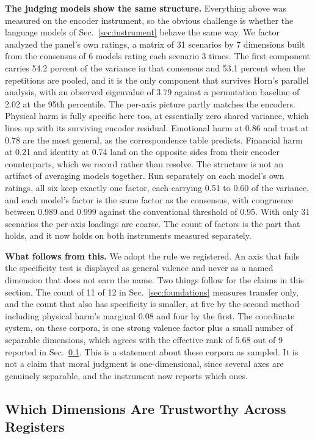 \documentclass[journal]{IEEEtran}
\begin{document}
\textbf{The judging models show the same structure.} Everything above was
measured on the encoder instrument, so the obvious challenge is whether the
language models of Sec.~\ref{sec:instrument} behave the same way. We factor
analyzed the panel's own ratings, a matrix of 31 scenarios by 7 dimensions
built from the consensus of 6 models rating each scenario 3 times. The first
component carries 54.2 percent of the variance in that consensus and 53.1
percent when the repetitions are pooled, and it is the only component that
survives Horn's parallel analysis, with an observed eigenvalue of 3.79
against a permutation baseline of 2.02 at the 95th percentile. The per-axis
picture partly matches the encoders. Physical harm is fully specific here
too, at essentially zero shared variance, which lines up with its surviving
encoder residual. Emotional harm at 0.86 and trust at 0.78 are the most
general, as the correspondence table predicts. Financial harm at 0.21 and
identity at 0.74 land on the opposite sides from their encoder counterparts,
which we record rather than resolve. The structure is not an artifact of
averaging models together. Run separately on each model's own ratings, all
six keep exactly one factor, each carrying 0.51 to 0.60 of the variance, and
each model's factor is the same factor as the consensus, with congruence
between 0.989 and 0.999 against the conventional threshold of 0.95. With only
31 scenarios the per-axis loadings are coarse. The count of factors is the
part that holds, and it now holds on both instruments measured separately.

\textbf{What follows from this.} We adopt the rule we registered. An axis that
fails the specificity test is displayed as general valence and never as a
named dimension that does not earn the name. Two things follow for the claims
in this section. The count of 11 of 12 in Sec.~\ref{sec:foundations} measures
transfer only, and the count that also has specificity is smaller, at five by
the second method including physical harm's marginal 0.08 and four by the
first. The coordinate system, on these corpora, is one strong valence factor
plus a small number of separable dimensions, which agrees with the effective
rank of 5.68 out of 9 reported in Sec.~\ref{sec:dissociation}. This is a
statement about these corpora as sampled. It is not a claim that moral
judgment is one-dimensional, since several axes are genuinely separable, and
the instrument now reports which ones.

\subsection{Which Dimensions Are Trustworthy Across Registers}
\label{sec:dissociation}
\end{document}
